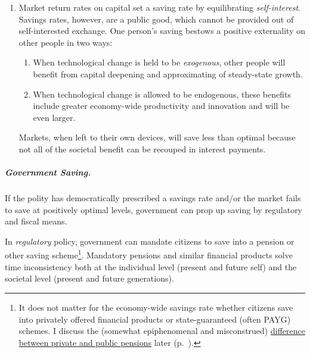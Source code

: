 \begin{enumerate}
	\item Market return rates on capital set a saving rate by equilibrating \emph{self-interest}. Savings rates, however, are a public good, which cannot be provided out of self-interested exchange. One person's saving  bestows a positive externality on other people in two ways:

	\begin{enumerate} 
		\item When technological change is held to be \emph{exogenous}, other people will benefit from capital deepening and approximating of steady-state growth. 
		\item When technological change is allowed to be endogenous, these benefits include greater economy-wide productivity and innovation and will be even larger. 
	\end{enumerate} 
	
	Markets, when left to their own devices, will save less than optimal because not all of the societal benefit can be recouped in interest payments. %
\end{enumerate}

\subparagraph{Government Saving.}  \label{sec:government-saves} If the polity has democratically prescribed a savings rate and/or the market fails to save at positively optimal levels, government can prop up saving by regulatory and fiscal means. 

In \emph{regulatory} policy, government can mandate citizens to save into a pension or other saving scheme\footnote{
	It does not matter for the economy-wide savings rate whether citizens save into privately offered financial products or state-guaranteed (often \gls{PAYG}) schemes. I discuss the (somewhat epiphenomenal and misconstrued) \hyperref[sec:pensions]{difference between private and public pensions} later (p.~\pageref{sec:pensions}).}. 
Mandatory pensions and similar financial products solve time inconsistency both at the individual level (present and future self) and the societal level (present and future generations). 

